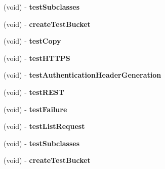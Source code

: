 \begin{DoxyCompactItemize}
\item 
\hypertarget{interface_a_s_i_s3_request_tests_a7d8d7e21e0b483ca67889868688adb7d}{
(void) -\/ {\bfseries test\-Subclasses}}
\label{interface_a_s_i_s3_request_tests_a7d8d7e21e0b483ca67889868688adb7d}

\item 
\hypertarget{interface_a_s_i_s3_request_tests_a8cc7c1272f528811ee7d8f5e07fb1133}{
(void) -\/ {\bfseries create\-Test\-Bucket}}
\label{interface_a_s_i_s3_request_tests_a8cc7c1272f528811ee7d8f5e07fb1133}

\item 
\hypertarget{interface_a_s_i_s3_request_tests_a47ba82f8750aba0ef3928d442442e5c8}{
(void) -\/ {\bfseries test\-Copy}}
\label{interface_a_s_i_s3_request_tests_a47ba82f8750aba0ef3928d442442e5c8}

\item 
\hypertarget{interface_a_s_i_s3_request_tests_ab3c1fecc3be8fa9465a8e7a20de1f49e}{
(void) -\/ {\bfseries test\-H\-T\-T\-P\-S}}
\label{interface_a_s_i_s3_request_tests_ab3c1fecc3be8fa9465a8e7a20de1f49e}

\item 
\hypertarget{interface_a_s_i_s3_request_tests_a60bdada8e76611d7d565dff4b2cfd8a9}{
(void) -\/ {\bfseries test\-Authentication\-Header\-Generation}}
\label{interface_a_s_i_s3_request_tests_a60bdada8e76611d7d565dff4b2cfd8a9}

\item 
\hypertarget{interface_a_s_i_s3_request_tests_a8ca48a7b94614a7026f7b7862b722f89}{
(void) -\/ {\bfseries test\-R\-E\-S\-T}}
\label{interface_a_s_i_s3_request_tests_a8ca48a7b94614a7026f7b7862b722f89}

\item 
\hypertarget{interface_a_s_i_s3_request_tests_a91778029a97f36e77dad559977cdb550}{
(void) -\/ {\bfseries test\-Failure}}
\label{interface_a_s_i_s3_request_tests_a91778029a97f36e77dad559977cdb550}

\item 
\hypertarget{interface_a_s_i_s3_request_tests_adf56486c5a0e74cfdf0711c5fa016fb9}{
(void) -\/ {\bfseries test\-List\-Request}}
\label{interface_a_s_i_s3_request_tests_adf56486c5a0e74cfdf0711c5fa016fb9}

\item 
\hypertarget{interface_a_s_i_s3_request_tests_a7d8d7e21e0b483ca67889868688adb7d}{
(void) -\/ {\bfseries test\-Subclasses}}
\label{interface_a_s_i_s3_request_tests_a7d8d7e21e0b483ca67889868688adb7d}

\item 
\hypertarget{interface_a_s_i_s3_request_tests_a8cc7c1272f528811ee7d8f5e07fb1133}{
(void) -\/ {\bfseries create\-Test\-Bucket}}
\label{interface_a_s_i_s3_request_tests_a8cc7c1272f528811ee7d8f5e07fb1133}


\end{DoxyCompactItemize}

